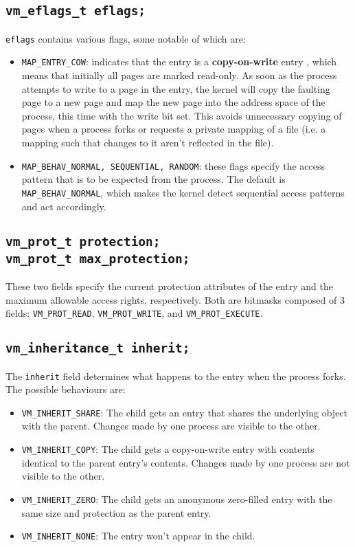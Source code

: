 \documentclass[shortabstract, english]{iithesis}
\begin{document}
\subsection*{\texttt{vm_eflags_t eflags;}}
\texttt{eflags} contains various flags, some notable of which are:
\begin{itemize}
\item \texttt{MAP_ENTRY_COW}: indicates that the entry is a
  \textbf{copy-on-write} entry \cite[Page~90]{bib:tanenbaum}, which means that
  initially all pages are marked read-only. As soon as the process attempts to
  write to a page in the entry, the kernel will copy the faulting page to a new
  page and map the new page into the address space of the process, this time
  with the write bit set. This avoids unnecessary copying of pages when a
  process forks or requests a private mapping of a file (i.e. a mapping such
  that changes to it aren't reflected in the file).
\item \texttt{MAP_BEHAV_{NORMAL, SEQUENTIAL, RANDOM}}: these flags
  specify the access pattern that is to be expected from the process. The
  default is \texttt{MAP_BEHAV_NORMAL}, which makes the kernel detect
  sequential access patterns and act accordingly.
\end{itemize}

\subsection*{\texttt{vm_prot_t protection;} \\
  \texttt{vm_prot_t max_protection;}}
These two fields specify the current protection attributes of the entry and the
maximum allowable access rights, respectively. Both are bitmasks composed of 3
fields: \texttt{VM_PROT_READ}, \texttt{VM_PROT_WRITE}, and
\texttt{VM_PROT_EXECUTE}.

\subsection*{\texttt{vm_inheritance_t inherit;}}
The \texttt{inherit} field determines what happens to the entry when the
process forks. The possible behaviours are:
\begin{itemize}
\item \texttt{VM_INHERIT_SHARE}: The child gets an entry that shares the
  underlying object with the parent. Changes made by one process are visible to
  the other.
\item \texttt{VM_INHERIT_COPY}: The child gets a copy-on-write entry with
  contents identical to the parent entry's contents. Changes made by one process
  are not visible to the other.
\item \texttt{VM_INHERIT_ZERO}: The child gets an anonymous zero-filled
  entry with the same size and protection as the parent entry.
\item \texttt{VM_INHERIT_NONE}: The entry won't appear in the child.
\end{itemize}
\end{document}
